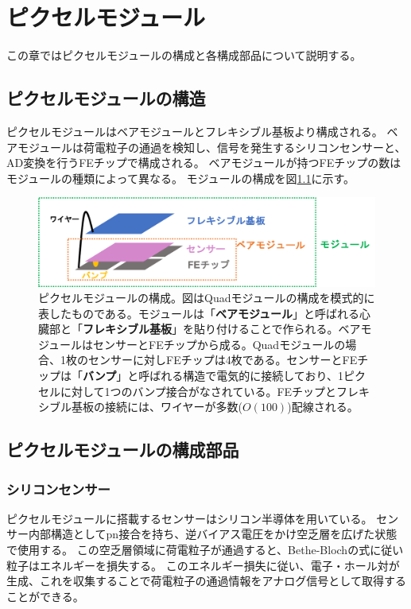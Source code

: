 \chapter{ピクセルモジュール}
この章ではピクセルモジュールの構成と各構成部品について説明する。

\section{ピクセルモジュールの構造}
ピクセルモジュールはベアモジュールとフレキシブル基板より構成される。
ベアモジュールは荷電粒子の通過を検知し、信号を発生するシリコンセンサーと、AD変換を行うFEチップで構成される。
ベアモジュールが持つFEチップの数はモジュールの種類によって異なる。
モジュールの構成を図\ref{module_configuration}に示す。

\begin{figure}[bpt]\centering
\includegraphics[width=14cm]{./module_configuration.png}
\caption[ピクセルモジュールの構成]{ピクセルモジュールの構成。図はQuadモジュールの構成を模式的に表したものである。モジュールは「\textbf{ベアモジュール}」と呼ばれる心臓部と「\textbf{フレキシブル基板}」を貼り付けることで作られる。ベアモジュールはセンサーとFEチップから成る。Quadモジュールの場合、1枚のセンサーに対しFEチップは4枚である。センサーとFEチップは「\textbf{バンプ}」と呼ばれる構造で電気的に接続しており、1ピクセルに対して1つのバンプ接合がなされている。FEチップとフレキシブル基板の接続には、ワイヤーが多数($O(100)$)配線される。}
\label{module_configuration}
\end{figure}

\section{ピクセルモジュールの構成部品}
\subsection{シリコンセンサー}
ピクセルモジュールに搭載するセンサーはシリコン半導体を用いている。
センサー内部構造としてpn接合を持ち、逆バイアス電圧をかけ空乏層を広げた状態で使用する\cite{2-1}。
この空乏層領域に荷電粒子が通過すると、Bethe-Blochの式\cite{2-3}に従い粒子はエネルギーを損失する。
このエネルギー損失に従い、電子・ホール対が生成、これを収集することで荷電粒子の通過情報をアナログ信号として取得することができる。

